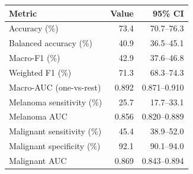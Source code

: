 \begin{tabular}{lrr}
\toprule
Metric & Value & 95\% CI \\
\midrule
Accuracy (\%) & 73.4 & 70.7--76.3 \\
Balanced accuracy (\%) & 40.9 & 36.5--45.1 \\
Macro-F1 (\%) & 42.9 & 37.6--46.8 \\
Weighted F1 (\%) & 71.3 & 68.3--74.3 \\
Macro-AUC (one-vs-rest) & 0.892 & 0.871--0.910 \\
Melanoma sensitivity (\%) & 25.7 & 17.7--33.1 \\
Melanoma AUC & 0.856 & 0.820--0.889 \\
Malignant sensitivity (\%) & 45.4 & 38.9--52.0 \\
Malignant specificity (\%) & 92.1 & 90.1--94.0 \\
Malignant AUC & 0.869 & 0.843--0.894 \\
\bottomrule
\end{tabular}
